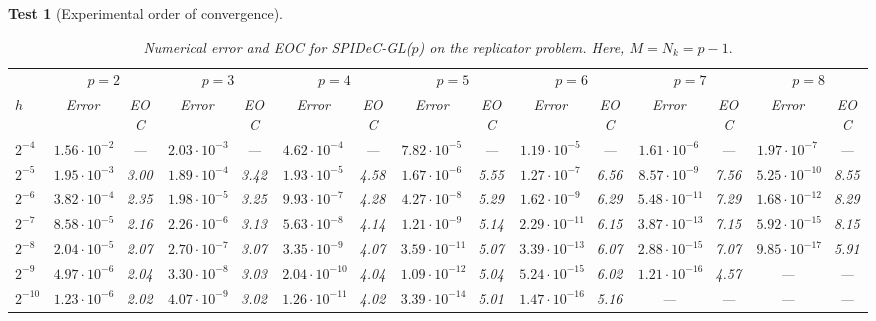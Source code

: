 \documentclass[a4paper,num-refs]{oup-contemporary-spidec}
\newtheorem{testcase}{Test} %
\begin{document}
\begin{testcase}[Experimental order of convergence]
\begin{table}[htb]
    \centering
    \caption{Numerical error and EOC for SPIDeC-GL($p$) on the replicator problem. Here, $M=N_k=p-1.$}\label{tab:GL_full}
    \scriptsize 
    \setlength{\tabcolsep}{3pt}
    \begin{tabular}{l |cc |cc |cc |cc |cc |cc |cc|}
    \toprule
    \multicolumn{1}{c}{} & \multicolumn{2}{c}{$p=2$} & \multicolumn{2}{c}{$p=3$} & \multicolumn{2}{c}{$p=4$} & \multicolumn{2}{c}{$p=5$} & \multicolumn{2}{c}{$p=6$} & \multicolumn{2}{c}{$p=7$} & \multicolumn{2}{c}{$p=8$} \\
    \cmidrule(lr){2-3} \cmidrule(lr){4-5} \cmidrule(lr){6-7} \cmidrule(lr){8-9} \cmidrule(lr){10-11} \cmidrule(lr){12-13} \cmidrule(lr){14-15}
    $h$ & Error & EOC & Error & EOC & Error & EOC & Error & EOC & Error & EOC & Error & EOC & Error & EOC \\
    \midrule
    $2^{-4}$ & $1.56 \cdot 10^{-2}$ & ---  & $2.03 \cdot 10^{-3}$ & ---  & $4.62 \cdot 10^{-4}$ & ---  & $7.82 \cdot 10^{-5}$ & ---  & $1.19 \cdot 10^{-5}$ & ---  & $1.61 \cdot 10^{-6}$ & ---  & $1.97 \cdot 10^{-7}$ & ---  \\
    $2^{-5}$ & $1.95 \cdot 10^{-3}$ & 3.00 & $1.89 \cdot 10^{-4}$ & 3.42 & $1.93 \cdot 10^{-5}$ & 4.58 & $1.67 \cdot 10^{-6}$ & 5.55 & $1.27 \cdot 10^{-7}$ & 6.56 & $8.57 \cdot 10^{-9}$ & 7.56 & $5.25 \cdot 10^{-10}$ & 8.55 \\
    $2^{-6}$ & $3.82 \cdot 10^{-4}$ & 2.35 & $1.98 \cdot 10^{-5}$ & 3.25 & $9.93 \cdot 10^{-7}$ & 4.28 & $4.27 \cdot 10^{-8}$ & 5.29 & $1.62 \cdot 10^{-9}$ & 6.29 & $5.48 \cdot 10^{-11}$ & 7.29 & $1.68 \cdot 10^{-12}$ & 8.29 \\
    $2^{-7}$ & $8.58 \cdot 10^{-5}$ & 2.16 & $2.26 \cdot 10^{-6}$ & 3.13 & $5.63 \cdot 10^{-8}$ & 4.14 & $1.21 \cdot 10^{-9}$ & 5.14 & $2.29 \cdot 10^{-11}$ & 6.15 & $3.87 \cdot 10^{-13}$ & 7.15 & $5.92 \cdot 10^{-15}$ & 8.15 \\
    $2^{-8}$ & $2.04 \cdot 10^{-5}$ & 2.07 & $2.70 \cdot 10^{-7}$ & 3.07 & $3.35 \cdot 10^{-9}$ & 4.07 & $3.59 \cdot 10^{-11}$ & 5.07 & $3.39 \cdot 10^{-13}$ & 6.07 & $2.88 \cdot 10^{-15}$ & 7.07 & $9.85 \cdot 10^{-17}$ & 5.91 \\
    $2^{-9}$ & $4.97 \cdot 10^{-6}$ & 2.04 & $3.30 \cdot 10^{-8}$ & 3.03 & $2.04 \cdot 10^{-10}$ & 4.04 & $1.09 \cdot 10^{-12}$ & 5.04 & $5.24 \cdot 10^{-15}$ & 6.02 & $1.21 \cdot 10^{-16}$ & 4.57 & --- & --- \\
    $2^{-10}$ & $1.23 \cdot 10^{-6}$ & 2.02 & $4.07 \cdot 10^{-9}$ & 3.02 & $1.26 \cdot 10^{-11}$ & 4.02 & $3.39 \cdot 10^{-14}$ & 5.01 & $1.47 \cdot 10^{-16}$ & 5.16 & --- & --- & --- & --- \\

\end{tabular}
\end{table}
\end{testcase}
\end{document}

